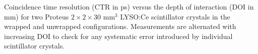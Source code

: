 \label{fig:ctrvsdoi} Coincidence time resolution (CTR in ps) versus the depth of interaction (DOI in mm) for two Proteus $2\times2\times30$ mm$^3$ LYSO:Ce scintillator crystals in the wrapped and unwrapped configurations. Measurements are alternated with increasing DOI to check for any systematic error introduced by individual scintillator crystals.